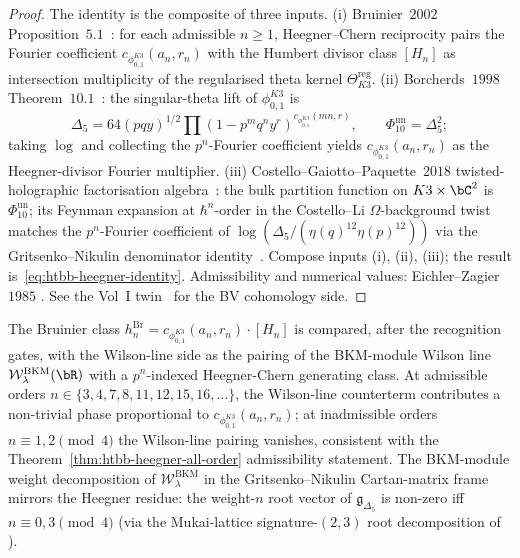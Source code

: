 \begin{proof}
The identity is the composite of three inputs. (i) Bruinier~$2002$
Proposition~$5.1$~\cite{Bruinier2002}: for each admissible $n\geq 1$,
Heegner--Chern reciprocity pairs the Fourier coefficient
\(c_{\phi_{0,1}^{K3}}(a_n,r_n)\) with the Humbert divisor class $[H_n]$ as
intersection multiplicity of the regularised theta kernel
\(\Theta^{\mathrm{reg}}_{K3}\). (ii) Borcherds~$1998$
Theorem~$10.1$~\cite{Borcherds1998}: the singular-theta lift of
\(\phi_{0,1}^{K3}\) is
\[
\Delta_5=64(pqy)^{1/2}\prod(1-p^mq^ny^r)^{c_{\phi_{0,1}^{K3}}(mn,r)},
\qquad \Phi_{10}^{\mathrm{un}}=\Delta_5^2;
\]
taking $\log$ and collecting the $p^n$-Fourier coefficient yields
\(c_{\phi_{0,1}^{K3}}(a_n,r_n)\) as the Heegner-divisor Fourier multiplier.
(iii) Costello--Gaiotto--Paquette~$2018$ twisted-holographic
factorisation algebra~\cite{CostelloGaiottoPaquette2018}: the bulk
partition function on $K3\times\bC^2$ is $\Phi_{10}^{\mathrm{un}}$; its Feynman
	expansion at $\hbar^n$-order in the Costello--Li $\Omega$-background
	twist \cite[\S 3]{CL16} matches the $p^n$-Fourier coefficient
		of \(\log(\Delta_5/(\eta(q)^{12}\eta(p)^{12}))\) via the Gritsenko--Nikulin denominator
identity~\cite[Thm.~2.1]{GritsenkoNikulin1998}. Compose inputs (i),
(ii), (iii); the result is~\eqref{eq:htbb-heegner-identity}.
Admissibility and numerical values: Eichler--Zagier~$1985$
\cite[Theorem 9.3, Table 1]{EichlerZagier1985}. See the Vol~I
twin~\cite[Theorem~\ref*{V1-thm:bvbrst-heegner-all-order}]{VolI}
for the BV cohomology side.
\end{proof}

\begin{remark}
\label{rem:htbb-heegner-line-defect-decomp}
The Bruinier class $h_n^{\mathrm{Br}} =
	c_{\phi_{0,1}^{K3}}(a_n,r_n)\cdot[H_n]$ is compared, after the recognition gates,
with the Wilson-line side as the pairing of the BKM-module Wilson line
$\mathcal{W}^{\mathrm{BKM}}_\lambda(\bR)$ with a $p^n$-indexed
Heegner-Chern generating class. At admissible orders
$n\in\{3, 4, 7, 8, 11, 12, 15, 16, \ldots\}$, the Wilson-line
counterterm contributes a non-trivial phase proportional to
	\(c_{\phi_{0,1}^{K3}}(a_n,r_n)\); at inadmissible orders $n\equiv 1, 2\pmod 4$ the
Wilson-line pairing vanishes, consistent with the
Theorem~\ref{thm:htbb-heegner-all-order} admissibility statement.
The BKM-module weight decomposition of
$\mathcal{W}^{\mathrm{BKM}}_\lambda$ in the Gritsenko--Nikulin
Cartan-matrix frame mirrors the Heegner residue: the weight-$n$ root
vector of $\mathfrak{g}_{\Delta_5}$ is non-zero iff $n\equiv 0, 3\pmod
4$ (via the Mukai-lattice signature-$(2, 3)$ root decomposition of
\cite[\S 3]{GritsenkoNikulin1997}).
\end{remark}


